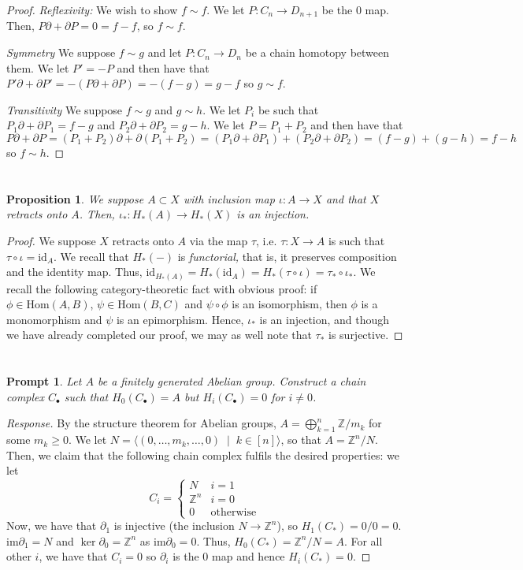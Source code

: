 \documentclass[english]{article}
\newcommand{\ZZ}{\mathbb{Z}}
\newcommand{\prob}[1]{\setcounter{section}{#1-1}\section{}}
\newtheorem*{proposition*}{Proposition}
\newtheorem*{prompt*}{Prompt}
\theoremstyle{remark}
\theoremstyle{definition}
\newcommand{\id}{\mathrm{id}}
\renewcommand{\hom}{\mathrm{Hom}}
\newcommand{\im}{\mathrm{im}}
\newcommand{\del}{\partial}
\begin{document}
\begin{proof}	
	\emph{Reflexivity:} We wish to show $f\sim f$. We let $P:C_n\to D_{n+1}$ be the $0$ map. Then, $P\del+\del P=0=f-f$, so $f\sim f$.
	
	\emph{Symmetry} We suppose $f\sim g$ and let $P:C_n\to D_n$ be a chain homotopy between them. We let $P'=-P$ and then have that $P'\del+\del P'=-(P\del +\del P)=-(f-g)=g-f$ so $g\sim f$. 
	
	\emph{Transitivity} We suppose $f\sim g$ and $g\sim h$. We let $P_i$ be such that $P_1\del+\del P_1=f-g$ and $P_2\del +\del P_2=g-h$. We let $P=P_1+P_2$ and then have that $P\del+\del P=(P_1+P_2)\del+\del (P_1+P_2)=(P_1\del +\del P_1) +(P_2\del +\del P_2) =(f-g)+(g-h)=f-h$ so $f\sim h$.
\end{proof}
\prob{4}
\begin{proposition*}
We suppose $A\subset X$ with inclusion map $\iota:A\to X$ and that $X$ retracts onto $A$. Then, $\iota_*:H_*(A)\to H_*(X)$ is an injection. 
\end{proposition*}

\begin{proof} We suppose
	$X$ retracts onto $A$ via the map $\tau$, i.e. $\tau:X\to A$ is such that $\tau\circ \iota=\id_A$. We recall that $H_*(-)$ is \emph{functorial,} that is, it preserves composition and the identity map. Thus, $\id_{H_*(A)}=H_*(\id_A)=H_*(\tau\circ \iota)=\tau_*\circ \iota_*$. We recall the following category-theoretic fact with obvious proof: if $\phi\in \hom(A,B)$, $\psi\in \hom(B,C)$ and $\psi\circ \phi$ is an isomorphism, then $\phi$ is a monomorphism and $\psi$ is an epimorphism. Hence, $\iota_*$ is an injection, and though we have already completed our proof, we may as well note that $\tau_*$ is surjective. 
\end{proof}
\prob{5} \begin{prompt*}
	Let $A$ be a finitely generated Abelian group. Construct a chain complex $C_\bullet$ such that $H_0(C_\bullet)=A$ but $H_i(C_\bullet)=0$ for $i\neq 0$.
\end{prompt*}
\begin{proof}[Response]
	By the structure theorem for Abelian groups, $A=\bigoplus_{k=1}^n \ZZ/{m_k}$ for some $m_k\geq 0$. We let $N=\langle (0,\hdots,m_k,\hdots,0)\;\mid\; k\in [n] \rangle $, so that $A=\ZZ^n/N$. Then, we claim that the following chain complex fulfils the desired properties: we let \begin{equation}
		C_i=\begin{cases}
			N     & i=1              \\
			\ZZ^n & i=0              \\
			0     & \text{otherwise}
		\end{cases}
	\end{equation}
Now,  we have that $\del_1$ is injective (the inclusion $N\to \ZZ^n$), so $H_1(C_*)=0/0=0$. $\im \del_1=N$ and $\ker \del_0=\ZZ^n$ as $\im\del_0=0$. Thus, $H_0(C_*)=\ZZ^n/N=A$. For all other $i$, we have that $C_i=0$ so $\del_i$ is the $0$ map and hence $H_i(C_*)=0$. 
\end{proof}
\end{document}
